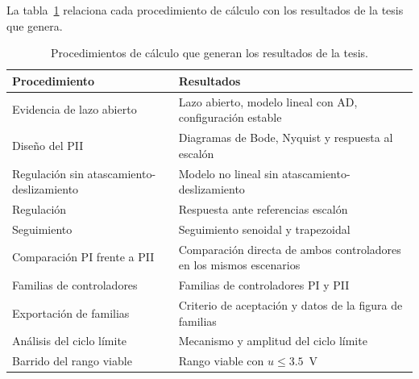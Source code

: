 La tabla~\ref{tab:scripts} relaciona cada procedimiento de cálculo con los resultados de la tesis que genera.

\begin{table}[ht]
\centering
\caption{Procedimientos de cálculo que generan los resultados de la tesis.}
\label{tab:scripts}
\small
\begin{tabular}{|p{}|p{}|}
\hline
Procedimiento & Resultados \\ \hline
Evidencia de lazo abierto & Lazo abierto, modelo lineal con AD, configuración estable \\ \hline
Diseño del PII & Diagramas de Bode, Nyquist y respuesta al escalón \\ \hline
Regulación sin atascamiento-deslizamiento & Modelo no lineal sin atascamiento-deslizamiento \\ \hline
Regulación & Respuesta ante referencias escalón \\ \hline
Seguimiento & Seguimiento senoidal y trapezoidal \\ \hline
Comparación PI frente a PII & Comparación directa de ambos controladores en los mismos escenarios \\ \hline
Familias de controladores & Familias de controladores PI y PII \\ \hline
Exportación de familias & Criterio de aceptación y datos de la figura de familias \\ \hline
Análisis del ciclo límite & Mecanismo y amplitud del ciclo límite \\ \hline
Barrido del rango viable & Rango viable con $u\le3.5$~V \\ \hline
\end{tabular}
\end{table}
